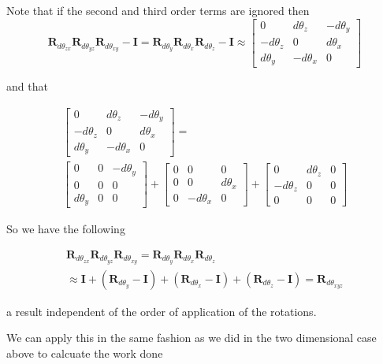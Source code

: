 \documentclass{article}      %
\newcommand{\BI}[0]{\mathbf{I}}
\newcommand{\BR}[0]{\mathbf{R}}
\begin{document}
Note that if the second and third order terms are ignored then
\begin{equation*}
\BR_{d\theta_{zx}}
\BR_{d\theta_{yz}}
\BR_{d\theta_{xy}} - \BI
%
=
%
\BR_{d\theta_y}
\BR_{d\theta_x}
\BR_{d\theta_z} - \BI
%
\approx
%
\begin{bmatrix}
0 & d\theta_z & -d\theta_y \\
-d\theta_z & 0 & d\theta_x \\
d\theta_y & -d\theta_x & 0
\end{bmatrix}
\end{equation*}

and that

\begin{multline*}
\begin{bmatrix}
0 & d\theta_z & -d\theta_y \\
-d\theta_z & 0 & d\theta_x \\
d\theta_y & -d\theta_x & 0
\end{bmatrix}
= \\
\begin{bmatrix}
 0 & 0 & -d\theta_y \\
 0 & 0 & 0 \\
 d\theta_y & 0 & 0
\end{bmatrix}
+
\begin{bmatrix}
 0 & 0 & 0 \\
 0 & 0 & d\theta_x \\
 0 & -d\theta_x & 0
\end{bmatrix}
+
\begin{bmatrix}
0 & d\theta_z & 0 \\
-d\theta_z & 0 & 0 \\
0 & 0 & 0
\end{bmatrix}
\end{multline*}

So we have the following

\begin{multline*}
\BR_{d\theta_{zx}}
\BR_{d\theta_{yz}}
\BR_{d\theta_{xy}}
%
=
%
\BR_{d\theta_y}
\BR_{d\theta_x}
\BR_{d\theta_z} \\
\approx
\BI +
(\BR_{d\theta_y} - \BI)
+
(\BR_{d\theta_x} - \BI)
+
(\BR_{d\theta_z} - \BI)
=
\BR_{d\theta_{xyz}}
\end{multline*}

a result independent of the order of application of the rotations.

We can apply this in the same fashion as we did in the two dimensional case above to
calcuate the work done
\end{document}
